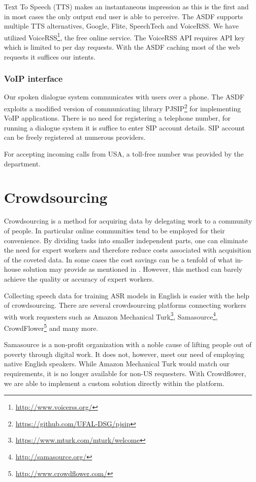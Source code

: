 Text To Speech (TTS) makes an instantaneous impression as this is the first and in most cases the only output end user is able to perceive. %
The ASDF supports multiple TTS alternatives, Google, Flite, SpeechTech and VoiceRSS.
We have utilized VoiceRSS\footnote{\url{http://www.voicerss.org/}}, the free online service.
The VoiceRSS API requires API key which is limited to per day requests.
With the ASDF caching most of the web requests it suffices our intents.

\subsubsection{VoIP interface}

Our spoken dialogue system communicates with users over a phone.
The ASDF exploits a modified version of communicating library PJSIP\footnote{\url{https://github.com/UFAL-DSG/pjsip}} for implementing VoIP applications.
There is no need for registering a telephone number, for running a dialogue system it is suffice to enter SIP account details.
SIP account can be freely registered at numerous providers.

For accepting incoming calls from USA, a toll-free number was provided by the department.

\section{Crowdsourcing}

Crowdsourcing is a method for acquiring data by delegating work to a community of people.
In particular online communities tend to be employed for their convenience.
By dividing tasks into smaller independent parts, one can eliminate the need for expert workers and therefore reduce costs associated with acquisition of the coveted data.
In some cases the cost savings can be a tenfold of what in-house solution may provide as mentioned in \cite{mturk}. %
However, this method can barely achieve the quality or accuracy of expert workers.

Collecting speech data for training ASR models in English is easier with the help of crowdsourcing.
There are several crowdsourcing platforms connecting workers with work requesters such as
Amazon Mechanical Turk\footnote{\url{https://www.mturk.com/mturk/welcome}},
Samasource\footnote{\url{http://samasource.org/}},
CrowdFlower\footnote{\url{http://www.crowdflower.com/}}
and many more.

Samasource is a non-profit organization with a noble cause of lifting people out of poverty through digital work.
It does not, however, meet our need of employing native English speakers.
While Amazon Mechanical Turk would match our requirements, it is no longer available for non-US requesters.
With Crowdflower, we are able to implement a custom solution directly within the platform.

